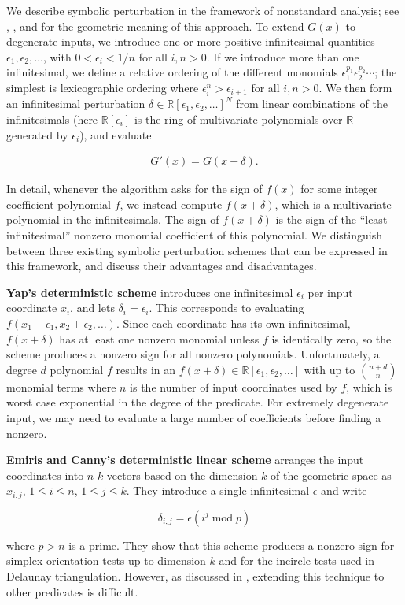 \documentclass[11pt]{article}
\newcommand{\R}{\mathbb{R}}
\begin{document}
We describe symbolic perturbation in the framework of nonstandard analysis; see \cite{yap1990symbolic}, \cite{emiris1995general},
and \cite{seidel1998nature} for the geometric meaning of this approach.  To extend $G(x)$ to degenerate inputs, we introduce one
or more positive infinitesimal quantities $\epsilon_1, \epsilon_2, \ldots$, with $0 < \epsilon_i < 1/n$ for all $i,n > 0$.  If
we introduce more than one infinitesimal, we define a relative ordering of the different monomials $\epsilon_1^{p_1} \epsilon_2^{p_2} \cdots$;
the simplest is lexicographic ordering where $\epsilon_i^n > \epsilon_{i+1}$ for all $i,n > 0$.
We then form an infinitesimal perturbation $\delta \in \R[\epsilon_1,\epsilon_2, \ldots]^N$ from
linear combinations of the infinitesimals (here $\R[\epsilon_i]$ is the ring of multivariate polynomials over $\R$ generated by $\epsilon_i$), and evaluate
\begin{linenomath*}
\begin{align*}
G'(x) = G(x+\delta).
\end{align*}
\end{linenomath*}
In detail, whenever the algorithm asks for the sign of $f(x)$ for some integer coefficient polynomial $f$, we instead compute
$f(x+\delta)$, which is a multivariate polynomial in the infinitesimals.  The sign of $f(x+\delta)$ is the sign of the ``least infinitesimal''
nonzero monomial coefficient of this polynomial.
We distinguish between three existing symbolic perturbation schemes that can be expressed in this framework, and discuss their advantages
and disadvantages.

{\bf Yap's deterministic scheme} \cite{yap1990symbolic} introduces one infinitesimal $\epsilon_i$ per input coordinate $x_i$, and lets $\delta_i = \epsilon_i$.  This
corresponds to evaluating $f(x_1+\epsilon_1, x_2+\epsilon_2, \ldots)$.  Since each coordinate has its own infinitesimal, $f(x+\delta)$ has at least
one nonzero monomial unless $f$ is identically zero, so the scheme produces a nonzero sign for all nonzero polynomials.  Unfortunately, a degree $d$ polynomial
$f$ results in an $f(x+\delta) \in \R[\epsilon_1,\epsilon_2, \ldots]$ with up to $\binom{n + d}{n}$ monomial terms where $n$ is the number of input
coordinates used by $f$, which is worst case exponential in the degree of the predicate.  For extremely degenerate input, we may need to evaluate a large
number of coefficients before finding a nonzero.

{\bf Emiris and Canny's deterministic linear scheme} \cite{emiris1992efficient} arranges the input coordinates into $n$ $k$-vectors based on the dimension
$k$ of the geometric space as $x_{i,j}$, $1 \le i \le n$, $1 \le j \le k$.  They introduce a single infinitesimal $\epsilon$ and write
\begin{linenomath*}
$$\delta_{i,j} = \epsilon (i^j \operatorname{mod} p)$$
\end{linenomath*}
where $p > n$ is a prime.  They show that this scheme produces a nonzero sign for simplex orientation tests up to dimension $k$ and for
the incircle tests used in Delaunay triangulation.  However, as discussed in \cite{seidel1998nature}, extending this technique to other predicates
is difficult.
\end{document}
